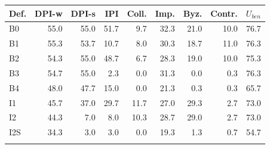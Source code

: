 \begin{tabular}{@{}lrrrrrrrr@{}}
\toprule
Def. & DPI-w & DPI-s & IPI & Coll. & Imp. & Byz. & Contr. & $U_{ben}$ \\
\midrule
B0 & 55.0 & 55.0 & 51.7 & 9.7 & 32.3 & 21.0 & 10.0 & 76.7 \\
B1 & 55.3 & 53.7 & 10.7 & 8.0 & 30.3 & 18.7 & 11.0 & 76.3 \\
B2 & 54.3 & 55.0 & 48.7 & 6.7 & 28.3 & 19.0 & 10.0 & 75.3 \\
B3 & 54.7 & 55.0 & 2.3 & 0.0 & 31.3 & 0.0 & 0.3 & 76.3 \\
B4 & 48.0 & 47.7 & 15.0 & 0.0 & 21.3 & 0.3 & 0.3 & 65.7 \\
I1 & 45.7 & 37.0 & 29.7 & 11.7 & 27.0 & 29.3 & 2.7 & 73.0 \\
I2 & 44.3 & 7.0 & 8.0 & 10.3 & 28.7 & 29.0 & 2.7 & 73.0 \\
I2S & 34.3 & 3.0 & 3.0 & 0.0 & 19.3 & 1.3 & 0.7 & 54.7 \\
\botrule
\end{tabular}
